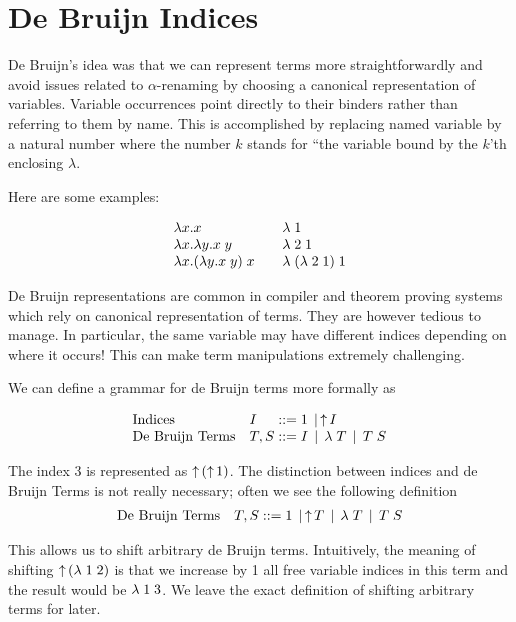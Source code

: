 \section{De Bruijn Indices}\label{sec:debruijn}

De Bruijn's idea was that we can represent terms more
straightforwardly and avoid issues related to $\alpha$-renaming by
choosing a canonical representation of variables. Variable occurrences
point directly to their binders rather than referring to them by
name. This is accomplished by replacing named variable by a natural
number where the number $k$ stands for ``the variable bound by the
$k$'th enclosing $\lambda$.

Here are some examples:

\[
\begin{array}{l@{\qquad}l}
\lam x. x  & \lamdb 1 \\
\lam x. \lam y . x\;y & \lamdb 2\; 1\\
\lam x. (\lam y. x \; y)\; x & \lamdb (\lamdb 2\;1) \;1
\end{array}
\]

De Bruijn representations are common in compiler and theorem proving
systems which rely on canonical representation of terms. They are
however tedious to manage. In particular, the same variable may have
different indices depending on where it occurs! This can make term
manipulations extremely challenging.

We can define a grammar for de Bruijn terms more formally as

\[
\begin{array}{ll@{\bnfas}l}
\mbox{Indices}         & I    & 1 \bnfalt \shift I \\
\mbox{De Bruijn Terms} & T, S & I \bnfalt \lamdb T \bnfalt T \app S
\end{array}
\]

The index $3$ is represented as $\uparrow^{}\!(\uparrow^{}\!1)$. The distinction
between indices and de Bruijn Terms is not really necessary; often we
see the following definition
\[
\begin{array}{ll@{\bnfas}l}
\mbox{De Bruijn Terms} & T, S & 1 \bnfalt \shift T \bnfalt \lamdb T \bnfalt T \app S
\end{array}
\]

This allows us to shift arbitrary de Bruijn terms. Intuitively, the
meaning of shifting $\uparrow^{}\!(\lambda\; 1 \; 2)$ is that we increase by 1 all free
variable indices in this term and the result would be $\lambda\; 1 \; 3$. We leave
the exact definition of shifting arbitrary terms for later.


